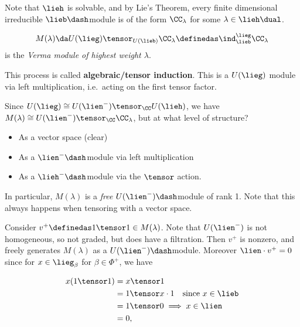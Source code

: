 Note that \(\lieh\) is solvable, and by Lie's Theorem, every finite
dimensional irreducible \(\lieb\dash\)module is of the form
\(\CC_\lambda\) for some \(\lambda \in \lieh\dual\).

\begin{definition}

\begin{align*}
M(\lambda) \da U(\lieg) \tensor_{U(\lieb)} \CC_\lambda \definedas \ind_\lieb^\lieg \CC_\lambda
\end{align*} is the \emph{Verma module of highest weight \(\lambda\)}.

\end{definition}

This process is called \textbf{algebraic/tensor induction}. This is a
\(U(\lieg)\) module via left multiplication, i.e.~acting on the first
tensor factor.

\begin{remark}

Since \(U(\lieg) \cong U(\lien^-) \tensor_\CC U(\lieh)\), we have
\(M(\lambda) \cong U(\lien^-) \tensor_\CC \CC_\lambda\), but at what
level of structure?

\begin{itemize}
\tightlist
\item
  As a vector space (clear)
\item
  As a \(\lien^-\dash\)module via left multiplication
\item
  As a \(\lieh^-\dash\)module via the \(\tensor\) action.
\end{itemize}

In particular, \(M(\lambda)\) is a \emph{free} \(U(\lien^-)\dash\)module
of rank 1. Note that this always happens when tensoring with a vector
space.

\end{remark}

Consider \(v^+ \definedas 1\tensor 1 \in M(\lambda)\). Note that
\(U(\lien^-)\) is not homogeneous, so not graded, but does have a
filtration. Then \(v^+\) is nonzero, and freely generates \(M(\lambda)\)
as a \(U(\lien^-)\dash\)module. Moreover \(\lien \cdot v^+ = 0\) since
for \(x\in \lieg_\beta\) for \(\beta \in \Phi^+\), we have

\begin{align*}
x(1\tensor 1) &= x\tensor 1  \\
&= 1\tensor x\cdot 1 \quad\text{since } x\in \lieb \\
&= 1 \tensor 0 \implies x\in \lien \\
&= 0
,\end{align*}

